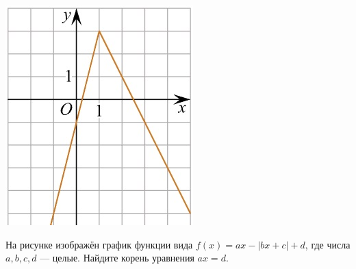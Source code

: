 \begin{class}[number=6]
\begin{listofex}
\begin{minipage}[c]{0.1\textwidth}
			\includegraphics[align=t, width=\textwidth]{pics/G101M4C6-8.jpg}
		\end{minipage}
		\item
		\begin{minipage}[t]{0.43\textwidth}
			На рисунке изображён график функции вида \(f(x)=ax-|bx+c|+d\), где числа \(a, b, c, d\) --- целые. Найдите корень уравнения \(ax=d\).
		\end{minipage}
		\begin{minipage}[c]{0.1\textwidth}

\end{minipage}
\end{listofex}
\end{class}
